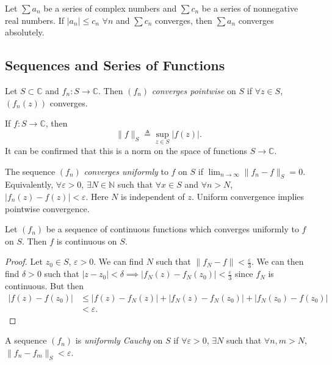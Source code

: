 Let $\sum a_n$ be a series of complex numbers and
$\sum c_n$ be a series of nonnegative real numbers.
If $|a_n| \leq c_n$ $\forall n$
and $\sum c_n$ converges, then $\sum a_n$
converges absolutely.

\subsection{Sequences and Series of Functions}
\begin{defn}
Let $S \subset \mathbb{C}$ and $f_n : S \to \mathbb{C}$.
Then $(f_n)$ \emph{converges pointwise} on $S$
if $\forall z \in S$, $(f_n(z))$ converges.
\end{defn}

\begin{defn}
  If $f : S \to \mathbb{C}$, then
  $$
  \| f \|_S \triangleq \sup_{z \in S} |f(z)|.
  $$
  It can be confirmed that this is a norm on the
  space of functions $S \to \mathbb{C}$.
\end{defn}

\begin{defn}
  The sequence $(f_n)$ \emph{converges uniformly} to $f$
  on $S$ if $\lim_{n \to \infty} \|f_n - f\|_S = 0$.
  Equivalently, $\forall \varepsilon > 0$,
  $\exists N \in \mathbb{N}$ such that
  $\forall x \in S$ and $\forall n > N$,
  $|f_n(z) - f(z)| < \varepsilon$. Here $N$ is
  independent of $z$. Uniform convergence implies
  pointwise convergence.
\end{defn}

\begin{theorem}
  Let $(f_n)$ be a sequence of continuous functions which converges
  uniformly to $f$ on $S$. Then $f$ is continuous on $S$.
\end{theorem}

\begin{proof}
  Let $z_0 \in S$, $\varepsilon > 0$. We can find $N$ such that
  $\|f_N - f\| < \frac{\varepsilon}{3}$. We can then find
  $\delta > 0$ such that
  $|z - z_0| < \delta \implies |f_N(z) - f_N(z_0)| < \frac{\varepsilon}{3}$
  since $f_N$ is continuous. But then
  \begin{align*}
         |f(z) - f(z_0)|
  & \leq |f(z) - f_N(z)| + |f_N(z) - f_N(z_0)| + |f_N(z_0) - f(z_0)| \\
  & < \varepsilon.
  \end{align*}
\end{proof}

\begin{defn}
  A sequence $(f_n)$ is \emph{uniformly Cauchy} on $S$
  if $\forall \varepsilon > 0$, $\exists N$ such that $\forall n, m > N$,
  $\| f_n - f_m \|_S < \varepsilon$.
\end{defn}

